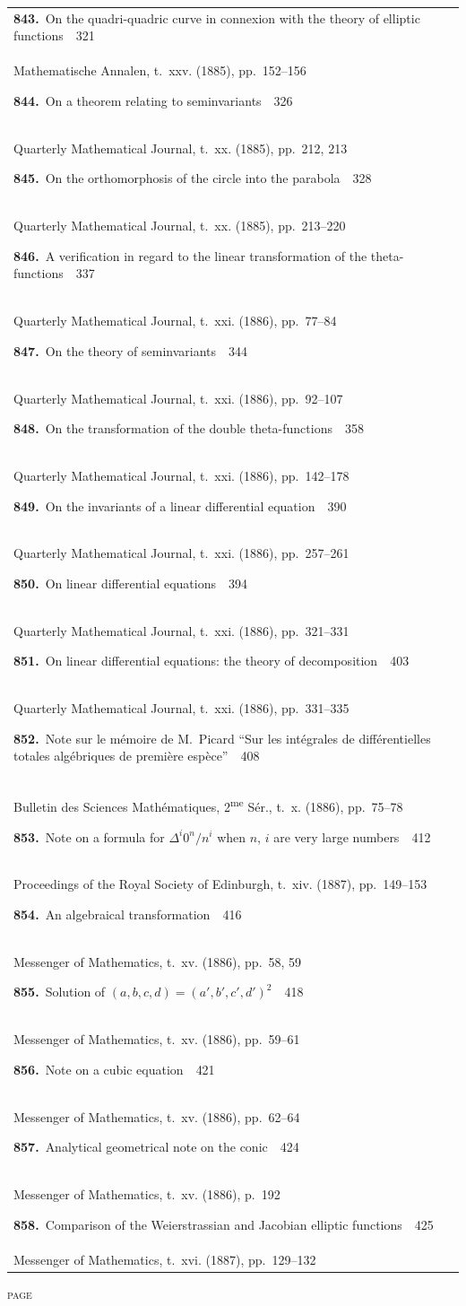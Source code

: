 \documentclass[11pt,a4paper]{book}
\newcommand{\paperentry}[4]{%
  \noindent\textbf{#1.}\ {#2}\ \dotfill\ {#3}\\[-0.2em]%
  {\small #4}\par\vspace{0.6em}%
}
\begin{document}
\begin{center}
\begin{tabular}{p{4.2in}r}
\paperentry{843}{On the quadri-quadric curve in connexion with the theory of elliptic functions}{321}{Mathematische Annalen, t.~xxv. (1885), pp.~152--156}
\paperentry{844}{On a theorem relating to seminvariants}{326}{Quarterly Mathematical Journal, t.~xx. (1885), pp.~212, 213}
\paperentry{845}{On the orthomorphosis of the circle into the parabola}{328}{Quarterly Mathematical Journal, t.~xx. (1885), pp.~213--220}
\paperentry{846}{A verification in regard to the linear transformation of the theta-functions}{337}{Quarterly Mathematical Journal, t.~xxi. (1886), pp.~77--84}
\paperentry{847}{On the theory of seminvariants}{344}{Quarterly Mathematical Journal, t.~xxi. (1886), pp.~92--107}
\paperentry{848}{On the transformation of the double theta-functions}{358}{Quarterly Mathematical Journal, t.~xxi. (1886), pp.~142--178}
\paperentry{849}{On the invariants of a linear differential equation}{390}{Quarterly Mathematical Journal, t.~xxi. (1886), pp.~257--261}
\paperentry{850}{On linear differential equations}{394}{Quarterly Mathematical Journal, t.~xxi. (1886), pp.~321--331}
\paperentry{851}{On linear differential equations: the theory of decomposition}{403}{Quarterly Mathematical Journal, t.~xxi. (1886), pp.~331--335}
\paperentry{852}{Note sur le m\'{e}moire de M.~Picard ``Sur les int\'{e}grales de diff\'{e}rentielles totales alg\'{e}briques de premi\`{e}re esp\`{e}ce''}{408}{Bulletin des Sciences Math\'{e}matiques, 2\textsuperscript{me} S\'{e}r., t.~x. (1886), pp.~75--78}
\paperentry{853}{Note on a formula for $\Delta^{i}0^{n}/n^{i}$ when $n$, $i$ are very large numbers}{412}{Proceedings of the Royal Society of Edinburgh, t.~xiv. (1887), pp.~149--153}
\paperentry{854}{An algebraical transformation}{416}{Messenger of Mathematics, t.~xv. (1886), pp.~58, 59}
\paperentry{855}{Solution of $(a, b, c, d) = (a', b', c', d')^{2}$}{418}{Messenger of Mathematics, t.~xv. (1886), pp.~59--61}
\paperentry{856}{Note on a cubic equation}{421}{Messenger of Mathematics, t.~xv. (1886), pp.~62--64}
\paperentry{857}{Analytical geometrical note on the conic}{424}{Messenger of Mathematics, t.~xv. (1886), p.~192}
\paperentry{858}{Comparison of the Weierstrassian and Jacobian elliptic functions}{425}{Messenger of Mathematics, t.~xvi. (1887), pp.~129--132}
\end{tabular}
\end{center}

\newpage
\thispagestyle{fancy}
\begin{center}
{\small\textsc{page}}
\end{center}
\vspace{-0.5em}
\end{document}
